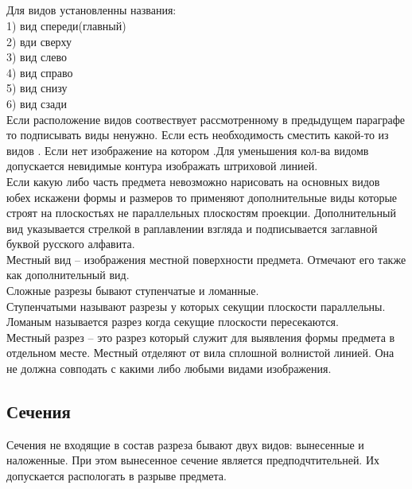 \documentclass[a4paper, 12pt]{article}
\begin{document}
\subsection{}

Для видов установленны названия:\\
1) вид спереди(главный)\\
2) вди сверху\\
3) вид слево\\
4) вид справо\\
5) вид снизу\\
6) вид сзади\\

Если расположение видов соотвествует рассмотренному в предыдущем параграфе то подписывать виды ненужно. Если есть необходимость сместить какой-то из видов .
Если нет изображение на котором .Для уменьшения кол-ва видомв допускается невидимые контура изображать штриховой линией.\\

Если какую либо часть предмета невозможно нарисовать на основных видов юбех искажени формы и размеров то применяют дополнительные виды которые строят на плоскостьях не параллельных плоскостям проекции. Дополнительный вид указывается стрелкой в раплавлении взгляда и подписывается заглавной буквой русского алфавита.\\

Местный вид -- изображения местной поверхности предмета. Отмечают его также как дополнительный вид.\\

Сложные разрезы бывают ступенчатые и ломанные. \\
Ступенчатыми называют разрезы у которых секущии плоскости параллельны.\\
Ломаным называется разрез когда секущие плоскости пересекаются.\\

Местный разрез -- это разрез который служит для выявления формы предмета в отдельном месте. Местный отделяют от вила сплошной волнистой линией. Она не должна совподать с какими либо любыми видами изображения.\\

\subsection{Сечения}

Сечения не входящие в состав разреза бывают двух видов: вынесенные и наложенные. При этом вынесенное сечение является предподчтительней. Их допускается распологать в разрыве предмета.\\
\end{document}

